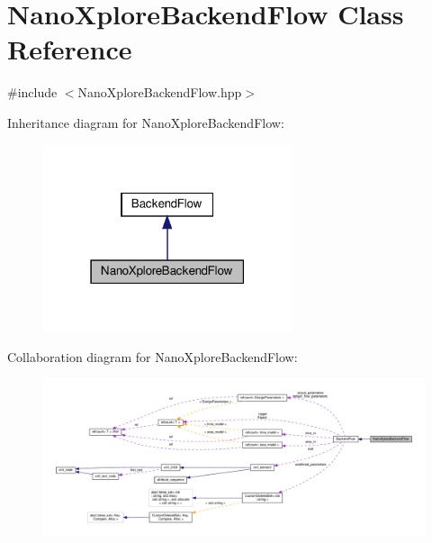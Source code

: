 \hypertarget{classNanoXploreBackendFlow}{}\section{Nano\+Xplore\+Backend\+Flow Class Reference}
\label{classNanoXploreBackendFlow}


{\ttfamily \#include $<$Nano\+Xplore\+Backend\+Flow.\+hpp$>$}



Inheritance diagram for Nano\+Xplore\+Backend\+Flow\+:
\nopagebreak
\begin{figure}[H]
\begin{center}
\leavevmode
\includegraphics[width=207pt]{de/de6/classNanoXploreBackendFlow__inherit__graph}
\end{center}
\end{figure}


Collaboration diagram for Nano\+Xplore\+Backend\+Flow\+:
\nopagebreak
\begin{figure}[H]
\begin{center}
\leavevmode
\includegraphics[width=350pt]{d4/d7e/classNanoXploreBackendFlow__coll__graph}
\end{center}
\end{figure}
